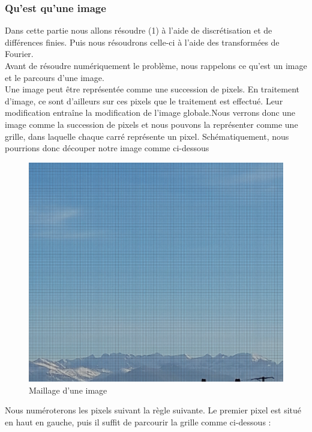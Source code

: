 \subsubsection{Qu'est qu'une image}
Dans cette partie nous allons résoudre (1) à l'aide de discrétisation et de différences finies. Puis nous résoudrons celle-ci à l'aide des transformées de Fourier. \\
Avant de résoudre numériquement le problème, nous rappelons ce qu'est un image et le parcours d'une image.\\
Une image peut être représentée comme une succession de pixels. En traitement d'image, ce sont d'ailleurs sur ces pixels que le traitement est effectué. Leur modification entraîne la modification de l'image globale.Nous verrons donc une image comme la succession de pixels et nous pouvons la représenter comme une grille, dans laquelle chaque carré représente un pixel.  Schématiquement, nous pourrions donc découper notre image comme ci-dessous
    \begin{figure}[!htb]
        \centering
       \includegraphics[scale = 0.07]{Images/Montagne_grille.jpg}
        \caption{Maillage d'une image}
        \label{fig:my_label}
    \end{figure}
Nous numéroterons les pixels suivant la règle suivante. Le premier pixel est situé en haut en gauche, puis il suffit de parcourir la grille comme ci-dessous : 

